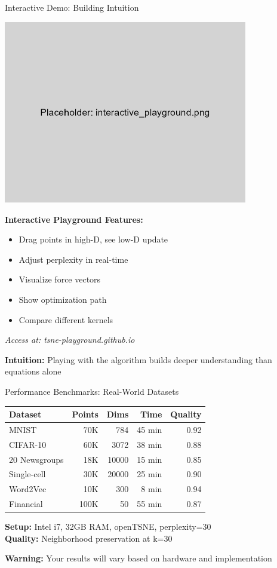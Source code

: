 \documentclass[aspectratio=169]{beamer}
\newcommand{\warning}[1]{\colorbox{red!10}{\textcolor{warningcolor}{\textbf{Warning:} #1}}}
\newcommand{\intuition}[1]{\colorbox{green!10}{\textcolor{intuitioncolor}{\textbf{Intuition:} #1}}}
\begin{document}
\begin{frame}{Interactive Demo: Building Intuition}
\begin{center}
\includegraphics[width=0.8\textwidth]{./Figures/interactive_playground.png}
\end{center}

\textbf{Interactive Playground Features:}
\begin{itemize}
\item Drag points in high-D, see low-D update
\item Adjust perplexity in real-time
\item Visualize force vectors
\item Show optimization path
\item Compare different kernels
\end{itemize}

\textit{Access at: tsne-playground.github.io}

\intuition{Playing with the algorithm builds deeper understanding than equations alone}
\end{frame}

\begin{frame}{Performance Benchmarks: Real-World Datasets}
\begin{center}
\begin{tabular}{l|r|r|r|r}
\textbf{Dataset} & \textbf{Points} & \textbf{Dims} & \textbf{Time} & \textbf{Quality}\\
\hline
MNIST & 70K & 784 & 45 min & 0.92\\
CIFAR-10 & 60K & 3072 & 38 min & 0.88\\
20 Newsgroups & 18K & 10000 & 15 min & 0.85\\
Single-cell & 30K & 20000 & 25 min & 0.90\\
Word2Vec & 10K & 300 & 8 min & 0.94\\
Financial & 100K & 50 & 55 min & 0.87
\end{tabular}
\end{center}

\textbf{Setup:} Intel i7, 32GB RAM, openTSNE, perplexity=30\\
\textbf{Quality:} Neighborhood preservation at k=30

\warning{Your results will vary based on hardware and implementation}
\end{frame}
\end{document}
